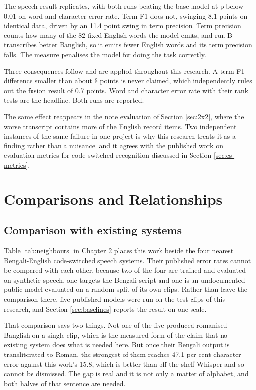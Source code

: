 The speech result replicates, with both runs beating the base model at p below 0.01 on
word and character error rate. Term F1 does not, swinging 8.1 points on identical data,
driven by an 11.4 point swing in term precision. Term precision counts how many of the 82
fixed English words the model emits, and run B transcribes better Banglish, so it emits
fewer English words and its term precision falls. The measure penalises the model for
doing the task correctly.

Three consequences follow and are applied throughout this research. A term F1 difference
smaller than about 8 points is never claimed, which independently rules out the fusion
result of 0.7 points. Word and character error rate with their rank tests are the
headline. Both runs are reported.

The same effect reappears in the note evaluation of Section \ref{sec:2x2}, where the worse
transcript contains more of the English record items. Two independent instances of the
same failure in one project is why this research treats it as a finding rather than a
nuisance, and it agrees with the published work on evaluation metrics for code-switched
recognition discussed in Section \ref{sec:cs-metrics}.

\section{Comparisons and Relationships}

\subsection{Comparison with existing systems}

Table \ref{tab:neighbours} in Chapter 2 places this work beside the four nearest
Bengali-English code-switched speech systems. Their published error rates cannot be
compared with each other, because two of the four are trained and evaluated on synthetic
speech, one targets the Bengali script and one is an undocumented public model evaluated
on a random split of its own clips. Rather than leave the comparison there, five published
models were run on the test clips of this research, and Section \ref{sec:baselines} reports
the result on one scale.

That comparison says two things. Not one of the five produced romanised Banglish on a
single clip, which is the measured form of the claim that no existing system does what is
needed here. But once their Bengali output is transliterated to Roman, the strongest of
them reaches 47.1 per cent character error against this work's 15.8, which is better than
off-the-shelf Whisper and so cannot be dismissed. The gap is real and it is not only a
matter of alphabet, and both halves of that sentence are needed.

